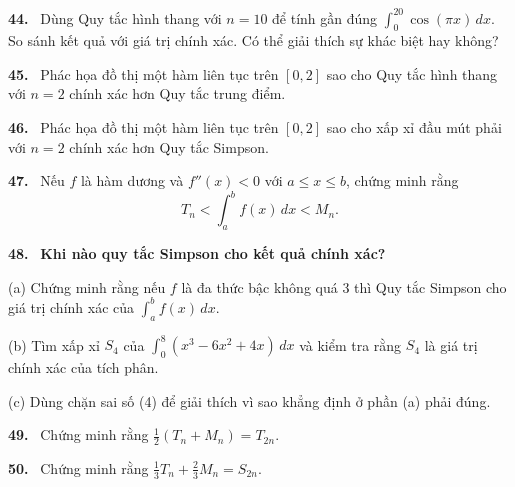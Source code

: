 \documentclass[12pt,a4paper]{article}
\newcommand{\bt}[1]{\par\smallskip\Needspace{5\baselineskip}\noindent\textbf{#1.}\ }
\begin{document}
\bt{44} Dùng Quy tắc hình thang với $n=10$ để tính gần đúng $\int_0^{20}\cos(\pi x)\,dx$. So sánh kết quả với giá trị chính xác. Có thể giải thích sự khác biệt hay không?

\bt{45} Phác họa đồ thị một hàm liên tục trên $[0,2]$ sao cho Quy tắc hình thang với $n=2$ chính xác hơn Quy tắc trung điểm.

\bt{46} Phác họa đồ thị một hàm liên tục trên $[0,2]$ sao cho xấp xỉ đầu mút phải với $n=2$ chính xác hơn Quy tắc Simpson.

\bt{47} Nếu $f$ là hàm dương và $f''(x)<0$ với $a\le x\le b$, chứng minh rằng
\[T_n<\int_a^b f(x)\,dx<M_n.\]

\bt{48} \textbf{Khi nào quy tắc Simpson cho kết quả chính xác?}

(a) Chứng minh rằng nếu $f$ là đa thức bậc không quá 3 thì Quy tắc Simpson cho giá trị chính xác của $\int_a^b f(x)\,dx$.

(b) Tìm xấp xỉ $S_4$ của $\int_0^8(x^3-6x^2+4x)\,dx$ và kiểm tra rằng $S_4$ là giá trị chính xác của tích phân.

(c) Dùng chặn sai số (4) để giải thích vì sao khẳng định ở phần (a) phải đúng.

\bt{49} Chứng minh rằng $\tfrac12(T_n+M_n)=T_{2n}$.
\bt{50} Chứng minh rằng $\tfrac13T_n+\tfrac23M_n=S_{2n}$.
\end{document}
